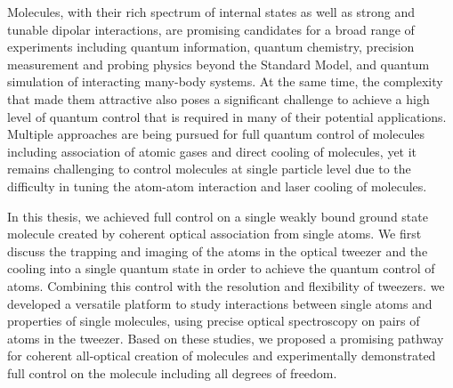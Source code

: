 
Molecules, with their rich spectrum of internal states as well as
strong and tunable dipolar interactions, are promising candidates for
a broad range of experiments including quantum information,
quantum chemistry, precision measurement and probing physics beyond the Standard Model,
and quantum simulation of interacting many-body systems.
At the same time, the complexity that made them attractive also poses a significant challenge
to achieve a high level of quantum control that is required in many of
their potential applications.
Multiple approaches are being pursued for full quantum control of molecules
including association of atomic gases and direct cooling of molecules,
yet it remains challenging to control molecules at single particle level
due to the difficulty in tuning the atom-atom interaction
and laser cooling of molecules.

In this thesis, we achieved full control on a single weakly bound ground state molecule
created by coherent optical association from single atoms.
We first discuss the trapping and imaging of the atoms in the optical tweezer
and the cooling into a single quantum state in order to achieve the quantum control of atoms.
Combining this control with the resolution and flexibility of tweezers.
we developed a versatile platform to study interactions
between single atoms and properties of single molecules,
using precise optical spectroscopy on pairs of atoms in the tweezer.
Based on these studies, we proposed a promising pathway
for coherent all-optical creation of molecules
and experimentally demonstrated full control on the molecule including all degrees of freedom.
